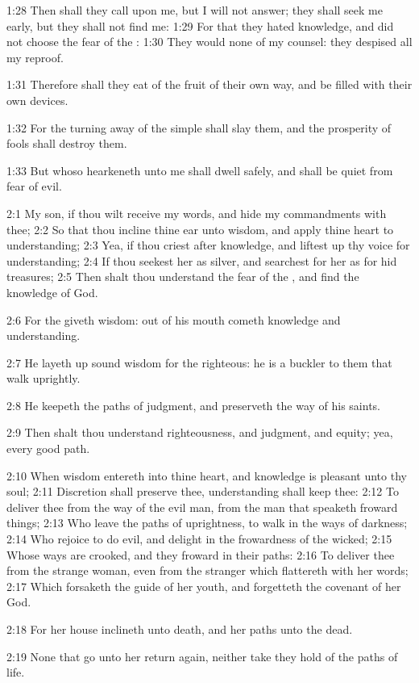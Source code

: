 1:28 Then shall they call upon me, but I will not answer; they shall seek me early, but they shall not find me: 1:29 For that they hated knowledge, and did not choose the fear of the \LORD: 1:30 They would none of my counsel: they despised all my reproof.

1:31 Therefore shall they eat of the fruit of their own way, and be filled with their own devices.

1:32 For the turning away of the simple shall slay them, and the prosperity of fools shall destroy them.

1:33 But whoso hearkeneth unto me shall dwell safely, and shall be quiet from fear of evil.

2:1 My son, if thou wilt receive my words, and hide my commandments with thee; 2:2 So that thou incline thine ear unto wisdom, and apply thine heart to understanding; 2:3 Yea, if thou criest after knowledge, and liftest up thy voice for understanding; 2:4 If thou seekest her as silver, and searchest for her as for hid treasures; 2:5 Then shalt thou understand the fear of the \LORD, and find the knowledge of God.

2:6 For the \LORD giveth wisdom: out of his mouth cometh knowledge and understanding.

2:7 He layeth up sound wisdom for the righteous: he is a buckler to them that walk uprightly.

2:8 He keepeth the paths of judgment, and preserveth the way of his saints.

2:9 Then shalt thou understand righteousness, and judgment, and equity; yea, every good path.

2:10 When wisdom entereth into thine heart, and knowledge is pleasant unto thy soul; 2:11 Discretion shall preserve thee, understanding shall keep thee: 2:12 To deliver thee from the way of the evil man, from the man that speaketh froward things; 2:13 Who leave the paths of uprightness, to walk in the ways of darkness; 2:14 Who rejoice to do evil, and delight in the frowardness of the wicked; 2:15 Whose ways are crooked, and they froward in their paths: 2:16 To deliver thee from the strange woman, even from the stranger which flattereth with her words; 2:17 Which forsaketh the guide of her youth, and forgetteth the covenant of her God.

2:18 For her house inclineth unto death, and her paths unto the dead.

2:19 None that go unto her return again, neither take they hold of the paths of life.


